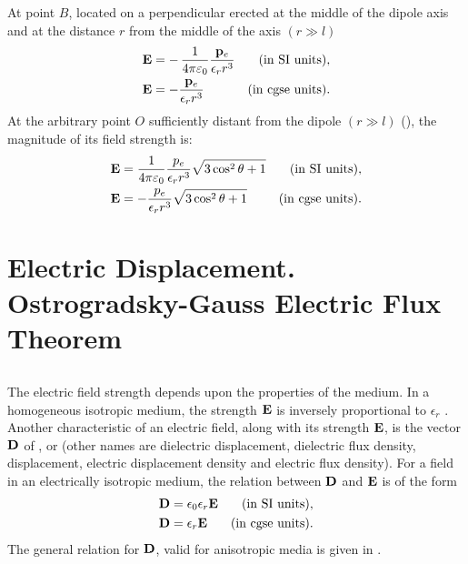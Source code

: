 At point $B$, located on a perpendicular erected at the middle of the dipole axis and at the distance $r$ from the middle of the axis $(r \gg l)$
\begin{align*}%
\vb{E} & = -\, \ofpe \frac{\vb{p}_{e}}{\epsilon_{r} r^{3}} & \text{(in SI units)},\\
\vb{E} & =  - \frac{\vb{p}_{e}}{\epsilon_{r} r^{3}} &\text{(in cgse units)}.
\end{align*}
At the arbitrary point $O$ sufficiently distant from the dipole $(r \gg l)$ (), the magnitude of its field strength is:
\begin{align*}%
\vb{E} & =  \ofpe \frac{{p}_{e}}{\epsilon_{r} r^{3}} \sqrt{3 \cos^{2} \theta + 1} & \text{(in SI units)},\\
\vb{E} & =  - \frac{{p}_{e}}{\epsilon_{r} r^{3}} \sqrt{3 \cos^{2} \theta + 1} & \text{(in cgse units).}
\end{align*}
 
\section{Electric Displacement. Ostrogradsky-Gauss Electric Flux Theorem}
\label{sec-15.3}

\subsection{}\label{15.3.1} The electric field strength  depends upon the properties of the medium. In a homogeneous isotropic medium, the strength $\vb{E}$ is inversely proportional to $\epsilon_{r}$ . Another characteristic of an electric field, along with its strength $\vb{E}$, is the vector $\vb{D}$ of , or  (other names are dielectric displacement, dielectric flux density, displacement, electric displacement density and electric flux density). For a field in an electrically isotropic medium, the relation between $\vb{D}$ and $\vb{E}$ is of the form
\begin{align*}%
\vb{D} & =  \epsilon_{0}\epsilon_{r} \vb{E} & \text{(in SI units)},\\
\vb{D} & =  \epsilon_{r} \vb{E} & \text{(in cgse units)}.
\end{align*}
The general relation for $\vb{D}$, valid for anisotropic media is given
in .

